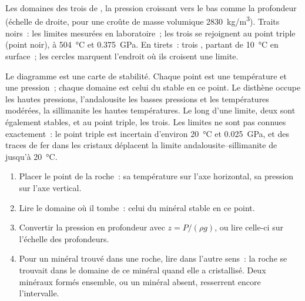 \begin{omfigure}
{\small Les domaines des trois  de , la pression
croissant vers le bas comme la profondeur (échelle de droite, pour une
croûte de masse volumique \qty{2830}{kg/m^3}). Traits noirs~: les limites
mesurées en laboratoire~; les trois se rejoignent au point triple (point
noir), à \qty{504}{\celsius} et \qty{0.375}{GPa}. En tirets~: trois
, partant de \qty{10}{\celsius} en surface~; les cercles marquent
l'endroit où ils croisent une limite.}
\end{omfigure}

Le diagramme est une carte de stabilité. Chaque point est une température
et une pression~; chaque domaine est celui du  stable en ce point.
Le disthène occupe les hautes pressions, l'andalousite les basses pressions
et les températures modérées, la sillimanite les hautes températures. Le
long d'une limite, deux  sont également stables, et au point
triple, les trois. Les limites ne sont pas connues exactement~: le point
triple est incertain d'environ \qty{20}{\celsius} et \qty{0.025}{GPa}, et
des traces de fer dans les cristaux déplacent la limite
andalousite--sillimanite de jusqu'à \qty{20}{\celsius}.

\begin{method}\label{met:g12:metamorphic-rocks:pt}
\begin{enumerate}
  \item Placer le point de la roche~: sa température sur l'axe horizontal,
        sa pression sur l'axe vertical.
  \item Lire le domaine où il tombe~: celui du minéral stable en ce point.
  \item Convertir la pression en profondeur avec $z = P/(\rho g)$, ou lire
        celle-ci sur l'échelle des profondeurs.
  \item Pour un minéral trouvé dans une roche, lire dans l'autre sens~: la
        roche se trouvait dans le domaine de ce minéral quand elle a
        cristallisé. Deux minéraux formés ensemble, ou un minéral absent,
        resserrent encore l'intervalle.
\end{enumerate}
\end{method}

